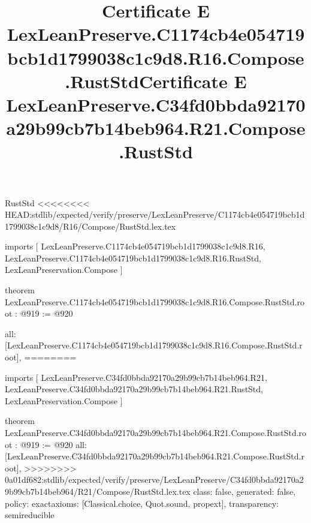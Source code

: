 \begin{lexlean}{RustStd}
<<<<<<<< HEAD:stdlib/expected/verify/preserve/LexLeanPreserve/C1174cb4e054719bcb1d1799038c1c9d8/R16/Compose/RustStd.lex.tex
\title{Certificate E LexLeanPreserve.C1174cb4e054719bcb1d1799038c1c9d8.R16.Compose.RustStd}
\begin{coremodule}
imports [
  LexLeanPreserve.C1174cb4e054719bcb1d1799038c1c9d8.R16,
  LexLeanPreserve.C1174cb4e054719bcb1d1799038c1c9d8.R16.RustStd,
  LexLeanPreservation.Compose
]

theorem LexLeanPreserve.C1174cb4e054719bcb1d1799038c1c9d8.R16.Compose.RustStd.root : @919 := @920 {
  all: [LexLeanPreserve.C1174cb4e054719bcb1d1799038c1c9d8.R16.Compose.RustStd.root],
========
\title{Certificate E LexLeanPreserve.C34fd0bbda92170a29b99cb7b14beb964.R21.Compose.RustStd}
\begin{coremodule}
imports [
  LexLeanPreserve.C34fd0bbda92170a29b99cb7b14beb964.R21,
  LexLeanPreserve.C34fd0bbda92170a29b99cb7b14beb964.R21.RustStd,
  LexLeanPreservation.Compose
]

theorem LexLeanPreserve.C34fd0bbda92170a29b99cb7b14beb964.R21.Compose.RustStd.root : @919 := @920 {
  all: [LexLeanPreserve.C34fd0bbda92170a29b99cb7b14beb964.R21.Compose.RustStd.root],
>>>>>>>> 0a01df682:stdlib/expected/verify/preserve/LexLeanPreserve/C34fd0bbda92170a29b99cb7b14beb964/R21/Compose/RustStd.lex.tex
  class: false,
  generated: false,
  policy: exact{axioms: [Classical.choice, Quot.sound, propext]},
  transparency: semireducible
}


\end{coremodule}}
\end{coremodule}
\end{lexlean}
